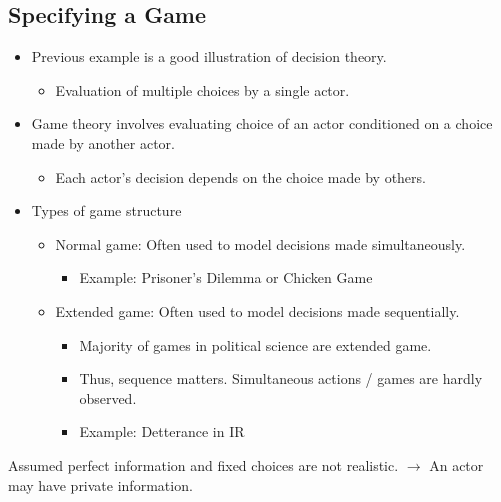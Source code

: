 \documentclass[]{book}
\providecommand{\tightlist}{%
  \setlength{\itemsep}{0pt}\setlength{\parskip}{0pt}}
\begin{document}
\hypertarget{specifying-a-game}{%
\subsection{Specifying a Game}\label{specifying-a-game}}

\begin{itemize}
\item
  Previous example is a good illustration of decision theory.

  \begin{itemize}
  \tightlist
  \item
    Evaluation of multiple choices by a single actor.
  \end{itemize}
\item
  Game theory involves evaluating choice of an actor conditioned on a choice made by another actor.

  \begin{itemize}
  \tightlist
  \item
    Each actor's decision depends on the choice made by others.
  \end{itemize}
\item
  Types of game structure

  \begin{itemize}
  \item
    Normal game: Often used to model decisions made simultaneously.

    \begin{itemize}
    \tightlist
    \item
      Example: Prisoner's Dilemma or Chicken Game
    \end{itemize}
  \item
    Extended game: Often used to model decisions made sequentially.

    \begin{itemize}
    \tightlist
    \item
      Majority of games in political science are extended game.
    \item
      Thus, sequence matters. Simultaneous actions / games are hardly observed.
    \item
      Example: Detterance in IR
    \end{itemize}
  \end{itemize}
\end{itemize}

Assumed perfect information and fixed choices are not realistic. \(\rightarrow\) An actor may have private information.
\end{document}
